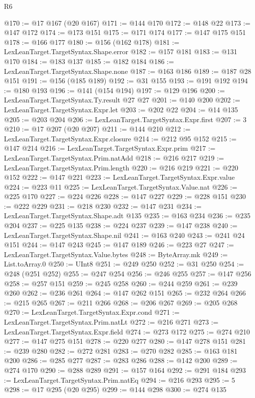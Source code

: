 \begin{lexlean}{R6}
\begin{coremodule}
@170 := @17 @167 (@20 @167)
@171 := @144 @170
@172 := @148 @22
@173 := @147 @172
@174 := @173 @151
@175 := @171 @174
@177 := @147 @175 @151
@178 := @166 @177
@180 := @156 (@162 @178)
@181 := LexLeanTarget.TargetSyntax.Shape.error
@182 := @157 @181
@183 := @131 @170
@184 := @183 @137
@185 := @182 @184
@186 := LexLeanTarget.TargetSyntax.Shape.none
@187 := @163 @186
@189 := @187 @28 @151
@191 := @156 (@185 @189)
@192 := @31 @155
@193 := @191 @192
@194 := @180 @193
@196 := @141 (@154 @194)
@197 := @129 @196
@200 := LexLeanTarget.TargetSyntax.Ty.result @27 @27
@201 := @140 @200
@202 := LexLeanTarget.TargetSyntax.Expr.let
@203 := @202 @22
@204 := @14 @135
@205 := @203 @204
@206 := LexLeanTarget.TargetSyntax.Expr.first
@207 := 3
@210 := @17 @207 (@20 @207)
@211 := @144 @210
@212 := LexLeanTarget.TargetSyntax.Expr.closure
@214 := @212 @95 @152
@215 := @147 @214
@216 := LexLeanTarget.TargetSyntax.Expr.prim
@217 := LexLeanTarget.TargetSyntax.Prim.natAdd
@218 := @216 @217
@219 := LexLeanTarget.TargetSyntax.Prim.length
@220 := @216 @219
@221 := @220 @152
@222 := @147 @221
@223 := LexLeanTarget.TargetSyntax.Expr.value
@224 := @223 @11
@225 := LexLeanTarget.TargetSyntax.Value.nat
@226 := @225 @170
@227 := @224 @226
@228 := @147 @227
@229 := @228 @151
@230 := @222 @229
@231 := @218 @230
@232 := @147 @231
@234 := LexLeanTarget.TargetSyntax.Shape.adt @135
@235 := @163 @234
@236 := @235 @204
@237 := @225 @135
@238 := @224 @237
@239 := @147 @238
@240 := LexLeanTarget.TargetSyntax.Shape.nil
@241 := @163 @240
@243 := @241 @24 @151
@244 := @147 @243
@245 := @147 @189
@246 := @223 @27
@247 := LexLeanTarget.TargetSyntax.Value.bytes
@248 := ByteArray.mk
@249 := List.toArray.{0}
@250 := UInt8
@251 := @249 @250
@252 := @31 @250
@254 := @248 (@251 @252)
@255 := @247 @254
@256 := @246 @255
@257 := @147 @256
@258 := @257 @151
@259 := @245 @258
@260 := @244 @259
@261 := @239 @260
@262 := @236 @261
@264 := @147 @262 @151
@265 := @232 @264
@266 := @215 @265
@267 := @211 @266
@268 := @206 @267
@269 := @205 @268
@270 := LexLeanTarget.TargetSyntax.Expr.cond
@271 := LexLeanTarget.TargetSyntax.Prim.natLt
@272 := @216 @271
@273 := LexLeanTarget.TargetSyntax.Expr.field
@274 := @273 @172
@275 := @274 @210
@277 := @147 @275 @151
@278 := @220 @277
@280 := @147 @278 @151
@281 := @239 @280
@282 := @272 @281
@283 := @270 @282
@285 := @163 @181 @200
@286 := @285 @277
@287 := @283 @286
@288 := @142 @200
@289 := @274 @170
@290 := @288 @289
@291 := @157 @164
@292 := @291 @184
@293 := LexLeanTarget.TargetSyntax.Prim.natEq
@294 := @216 @293
@295 := 5
@298 := @17 @295 (@20 @295)
@299 := @144 @298
@300 := @274 @135

\end{coremodule}
\end{lexlean}
